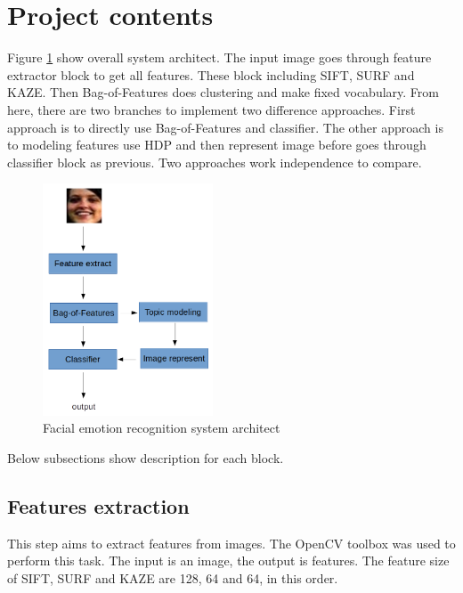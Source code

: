 \documentclass[12pt]{article}
\begin{document}

\section{Project contents} \label{sec:project-contents}


Figure \ref{fig:system-architect} show overall system architect.
The input image goes through feature extractor block to get all features.
These block including SIFT, SURF and KAZE.
Then Bag-of-Features does clustering and make fixed vocabulary.
From here, there are two branches to implement two difference approaches.
First approach is to directly use Bag-of-Features and classifier.
The other approach is to modeling features use HDP and then represent image before goes through classifier block as previous.
Two approaches work independence to compare.
\begin{figure}[h!]
    \centering
    \includegraphics[width=0.45\textwidth]{system-arch-cropped.png}
    \caption{Facial emotion recognition system architect} \label{fig:system-architect}
\end{figure}

Below subsections show description for each block.

\subsection{Features extraction}
This step aims to extract features from images.
The OpenCV toolbox \cite{opencv_library} was used to perform this task.
The input is an image, the output is features.
The feature size of SIFT, SURF and KAZE are 128, 64  and 64, in this order.
\end{document}
